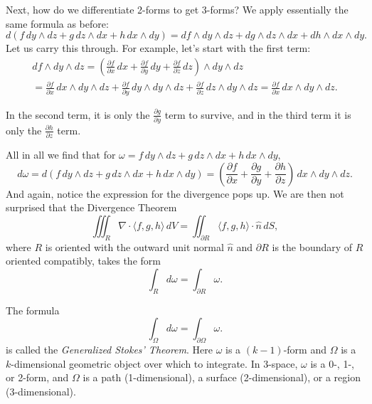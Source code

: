 \documentclass[12pt]{article}
\begin{document}
Next, how do we differentiate 2-forms to get 3-forms?  We apply essentially
the same formula as before:
\[
d(
f\, dy \wedge dz + 
g\, dz \wedge dx +
h\, dx \wedge dy
)
=
df \wedge dy \wedge dz + 
dg \wedge dz \wedge dx +
dh \wedge dx \wedge dy .
\]
Let us carry this through.  For example, let's start with the first
term:
\begin{multline*}
df \wedge dy \wedge dz 
=
\left(
\frac{\partial f}{\partial x} \, dx +
\frac{\partial f}{\partial y} \, dy +
\frac{\partial f}{\partial z} \, dz 
\right)
\wedge dy \wedge dz 
\\
=
\frac{\partial f}{\partial x} \, dx 
\wedge dy \wedge dz +
\frac{\partial f}{\partial y} \, dy 
\wedge dy \wedge dz +
\frac{\partial f}{\partial z} \, dz 
\wedge dy \wedge dz 
=
\frac{\partial f}{\partial x} \, dx \wedge dy \wedge dz .
\end{multline*}

In the second term, it is only the $\frac{\partial g}{\partial y}$ term to
survive, and in the third term it is only the
$\frac{\partial h}{\partial z}$ term.

All in all we find
that for
$\omega = f\, dy \wedge dz + 
g\, dz \wedge dx +
h\, dx \wedge dy$,
\begin{equation*}
d\omega =
d(
f\, dy \wedge dz + 
g\, dz \wedge dx +
h\, dx \wedge dy
)
=
\left(\frac{\partial f}{\partial x} +
\frac{\partial g}{\partial y} +
\frac{\partial h}{\partial z} \right) \, dx \wedge dy \wedge dz .
\end{equation*}
And again, notice the expression for the divergence pops up.
We are then not surprised that the Divergence Theorem
\begin{equation*}
\iiint_R \nabla \cdot \langle f,g,h \rangle \, dV = \iint_{\partial R}
\langle f,g,h \rangle \cdot
\hat{n} \, dS,
\end{equation*}
where $R$ is oriented with the outward unit normal $\hat{n}$
and
$\partial R$ is the boundary of $R$ oriented compatibly,
takes the form
\begin{equation*}
\int_R d \omega = \int_{\partial R} \omega .
\end{equation*}

The formula
\begin{equation*}
\int_\Omega d \omega = \int_{\partial \Omega} \omega .
\end{equation*}
is called the \emph{Generalized Stokes' Theorem}.  Here $\omega$ is a
$(k-1)$-form and $\Omega$ is a $k$-dimensional geometric object over which to
integrate.  In 3-space, $\omega$ is a 0-, 1-, or 2-form, and
$\Omega$ is a path (1-dimensional), a surface
(2-dimensional), or a region (3-dimensional).
\end{document}
